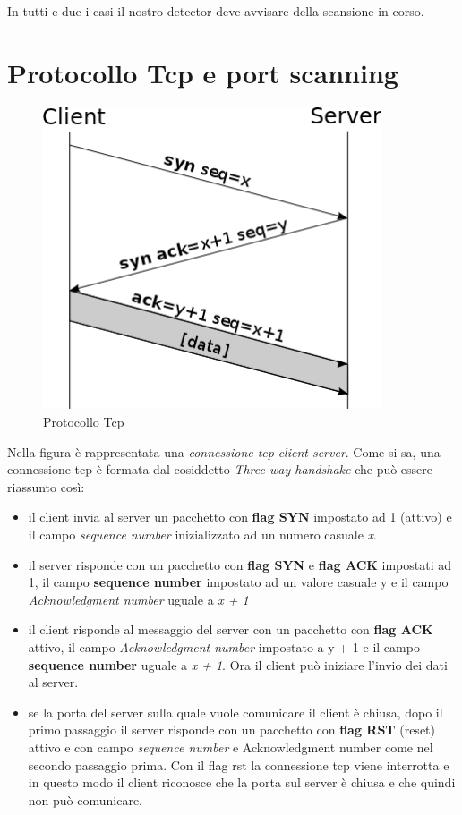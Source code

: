 \documentclass[a4paper,12pt]{article} %
\begin{document}
In tutti e due i casi il nostro detector deve avvisare della scansione in corso.




\section{Protocollo Tcp e port scanning}

\begin{figure}[htbp]
\centering
\includegraphics[width=10cm]{tcp.png}
\caption{\label{Protocollo tcp} Protocollo Tcp}
\end{figure}



Nella figura è rappresentata una \emph{connessione tcp} \emph{client-server}. Come si sa, una connessione tcp è formata dal cosiddetto
\emph{Three-way handshake} che può essere riassunto così:

\begin{itemize}

\item il client invia al server un pacchetto con \textbf{flag SYN} impostato ad 1 (attivo) e il campo \emph{sequence number}
inizializzato ad un numero casuale \emph{x}.


\item il server risponde con un pacchetto con \textbf{flag SYN} e \textbf{flag ACK} impostati ad 1, il campo \textbf{sequence number}
impostato ad un valore casuale y e il campo \emph{Acknowledgment number} uguale a \emph{x + 1} 

\item il client risponde al messaggio del server con un pacchetto con \textbf{flag ACK} attivo, il campo \emph{Acknowledgment number} impostato a y + 1 e il campo \textbf{sequence number} uguale a \emph{x + 1}. Ora il client può iniziare
l'invio dei dati al server.


\item se la porta del server sulla quale vuole comunicare il client è chiusa, dopo il primo passaggio il server risponde con un pacchetto con \textbf{flag RST} (reset) attivo e con campo \emph{sequence number} e {Acknowledgment number} come nel secondo passaggio prima. Con il flag rst la connessione tcp viene interrotta e in questo modo il client riconosce che la porta sul server è chiusa e che quindi non può comunicare.


\end{itemize}
\end{document}
